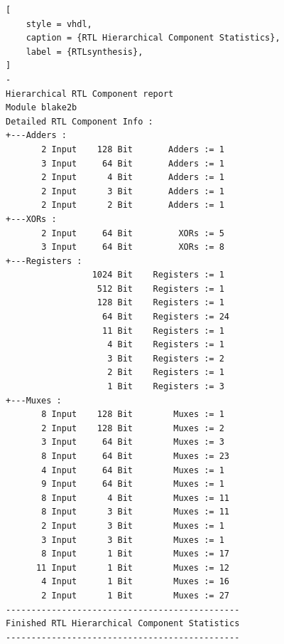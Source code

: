 \documentclass[%
	a4paper,
]
{article}
\begin{document}
\begin{lstlisting}[
	style = vhdl,
	caption = {RTL Hierarchical Component Statistics},
	label = {RTLsynthesis},
]
-
Hierarchical RTL Component report 
Module blake2b 
Detailed RTL Component Info : 
+---Adders : 
	   2 Input    128 Bit       Adders := 1     
	   3 Input     64 Bit       Adders := 1     
	   2 Input      4 Bit       Adders := 1     
	   2 Input      3 Bit       Adders := 1     
	   2 Input      2 Bit       Adders := 1     
+---XORs : 
	   2 Input     64 Bit         XORs := 5     
	   3 Input     64 Bit         XORs := 8     
+---Registers : 
	             1024 Bit    Registers := 1     
	              512 Bit    Registers := 1     
	              128 Bit    Registers := 1     
	               64 Bit    Registers := 24    
	               11 Bit    Registers := 1    
	                4 Bit    Registers := 1     
	                3 Bit    Registers := 2     
	                2 Bit    Registers := 1     
	                1 Bit    Registers := 3     
+---Muxes : 
	   8 Input    128 Bit        Muxes := 1     
	   2 Input    128 Bit        Muxes := 2     
	   3 Input     64 Bit        Muxes := 3     
	   8 Input     64 Bit        Muxes := 23    
	   4 Input     64 Bit        Muxes := 1     
	   9 Input     64 Bit        Muxes := 1     
	   8 Input      4 Bit        Muxes := 11    
	   8 Input      3 Bit        Muxes := 11    
	   2 Input      3 Bit        Muxes := 1     
	   3 Input      3 Bit        Muxes := 1     
	   8 Input      1 Bit        Muxes := 17    
	  11 Input      1 Bit        Muxes := 12    
	   4 Input      1 Bit        Muxes := 16    
	   2 Input      1 Bit        Muxes := 27    
----------------------------------------------
Finished RTL Hierarchical Component Statistics
----------------------------------------------

\end{lstlisting}



%
%
\end{document}

